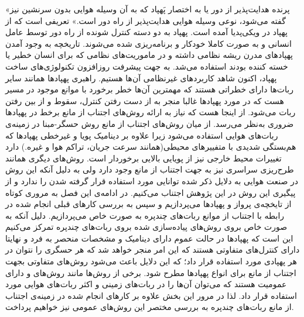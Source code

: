 «پرنده هدایت‌پذیر از دور یا به اختصار پَهپاد که به آن وسیله هوایی بدون سرنشین نیز گفته می‌شود، نوعی وسیله هوایی هدایت‌پذیر از راه دور است.» تعریفی است که از پهپاد در ویکی‌پدیا آمده است. پهپاد به دو دسته کنترل شونده از راه دور توسط عامل انسانی و به صورت کاملا خودکار و برنامه‌ریزی شده می‌شوند. تاریخچه به وجود آمدن پهپادهای مدرن ریشه نظامی داشته و در ماموریت‌های نظامی که برای انسان خطیر یا خسته کننده بودند استفاده می‌شد. به جهت پیشرفت روزافزون تکنولوژی‌های ساخت پهپاد، اکنون شاهد کاربردهای غیرنظامی آن‌ها هستیم. راهبری پهپادها همانند سایر ربات‌ها دارای خطراتی هستند که مهمترین آن‌ها خطر برخورد با موانع موجود در مسیر هست که در مورد پهپادها غالبا منجر به از دست رفتن کنترل، سقوط و از بین رفتن ربات می‌شود. از اینجا هست که نیاز به ارائه روش‌های اجتناب از مانع برخط در پهپادها ضروری به‌نظر می‌رسد. از میان روش‌های اجتناب از مانع روش حسگر-مبنا در زمینه‌ی ربات‌های هوایی استفاده می‌شود زیرا علاوه بر دینامیک پویا و غیرخطی پهپادها که هم‌بستگی شدیدی با متفییرهای محیطی(همانند سرعت جریان، تراکم هوا و غیره.) دارد تغییرات محیط خارجی نیز از پویایی بالایی برخوردار است. روش‌های دیگری همانند طرح‌ریزی سراسری نیز به جهت اجتناب از مانع وجود دارد ولی به دلیل آنکه این روش در صنعت هوایی به دلایل ذکر شده توانایی مورد استفاده قرار گرفته شدن را ندارد و از پیگیری این روش در این پژوهش اجتناب می‌کنیم.
در ادامه‌ی این فصل به مروری کوتاه از تایخچه‌ی پرواز و پهپادها می‌پردازیم و سپس به بررسی کارهای قبلی انجام شده در رابطه با اجتناب از موانع ربات‌های چندپره به صورت خاص می‌پردازیم. دلیل آنکه به صورت خاص بروی روش‌های پیاده‌سازی شده بروی ربات‌های چندپره تمرکز می‌کنیم این است که پهپادها در حالت عموم دارای دینامیک‌ و مشخصات منحصر به فرد و نهایتا دارای کنترل‌های متفاوتی هستند که این امر منجر خواهد شد که هر حسگری را نتوان در هر پهپادی مورد استفاده قرار داد؛ که این دلایل باعث می‌شود روش‌های متفاوتی بجهت اجتناب از مانع برای انواع پهپادها مطرح شود. برخی از روش‌ها مانند روش‌های  و  دارای عمومیت هستند که می‌توان آن‌ها را در ربات‌های زمینی و اکثر ربات‌های هوایی مورد استفاده قرار داد. لذا در مرور این بخش علاوه بر کارهای انجام شده در زمینه‌ی اجتناب از مانع ربات‌های چندپره به بررسی مختصر این روش‌های عمومی نیز خواهیم پرداخت.